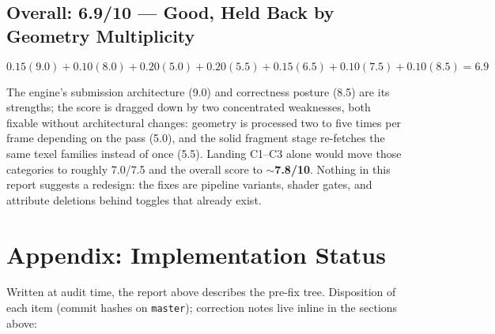 \documentclass[11pt,a4paper]{article}
\begin{document}
\subsection{Overall: 6.9/10 --- Good, Held Back by Geometry Multiplicity}

\begin{equation}
0.15(9.0) + 0.10(8.0) + 0.20(5.0) + 0.20(5.5) + 0.15(6.5) + 0.10(7.5) + 0.10(8.5) = \mathbf{6.9}
\end{equation}

The engine's submission architecture (9.0) and correctness posture (8.5) are
its strengths; the score is dragged down by two concentrated weaknesses, both
fixable without architectural changes: geometry is processed two to five
times per frame depending on the pass (5.0), and the solid fragment stage
re-fetches the same texel families instead of once (5.5). Landing C1--C3
alone would move those categories to roughly 7.0/7.5 and the overall score to
\textbf{$\sim$7.8/10}. Nothing in this report suggests a redesign: the fixes
are pipeline variants, shader gates, and attribute deletions behind toggles
that already exist.

\section*{Appendix: Implementation Status}

Written at audit time, the report above describes the pre-fix tree. Disposition
of each item (commit hashes on \texttt{master}); correction notes live inline
in the sections above:
\end{document}
